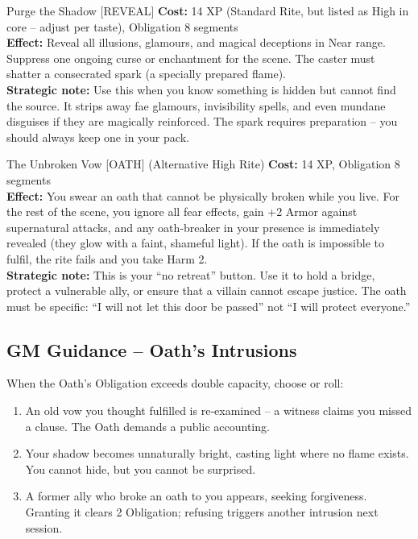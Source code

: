 \documentclass[10pt,a5paper]{book}
\begin{document}
\begin{patronbox}{Purge the Shadow [REVEAL]}
\textbf{Cost:} 14 XP (Standard Rite, but listed as High in core – adjust per taste), Obligation 8 segments \\
\textbf{Effect:} Reveal all illusions, glamours, and magical deceptions in Near range. Suppress one ongoing curse or enchantment for the scene. The caster must shatter a consecrated spark (a specially prepared flame). \\
\textbf{Strategic note:} Use this when you know something is hidden but cannot find the source. It strips away fae glamours, invisibility spells, and even mundane disguises if they are magically reinforced. The spark requires preparation – you should always keep one in your pack.
\end{patronbox}

\begin{patronbox}{The Unbroken Vow [OATH] (Alternative High Rite)}
\textbf{Cost:} 14 XP, Obligation 8 segments \\
\textbf{Effect:} You swear an oath that cannot be physically broken while you live. For the rest of the scene, you ignore all fear effects, gain +2 Armor against supernatural attacks, and any oath‑breaker in your presence is immediately revealed (they glow with a faint, shameful light). If the oath is impossible to fulfil, the rite fails and you take Harm 2. \\
\textbf{Strategic note:} This is your “no retreat” button. Use it to hold a bridge, protect a vulnerable ally, or ensure that a villain cannot escape justice. The oath must be specific: “I will not let this door be passed” not “I will protect everyone.”
\end{patronbox}

\subsection*{GM Guidance – Oath’s Intrusions}

When the Oath’s Obligation exceeds double capacity, choose or roll:
\begin{enumerate}
    \item An old vow you thought fulfilled is re‑examined – a witness claims you missed a clause. The Oath demands a public accounting.
    \item Your shadow becomes unnaturally bright, casting light where no flame exists. You cannot hide, but you cannot be surprised.
    \item A former ally who broke an oath to you appears, seeking forgiveness. Granting it clears 2 Obligation; refusing triggers another intrusion next session.
\end{enumerate}
\end{document}
